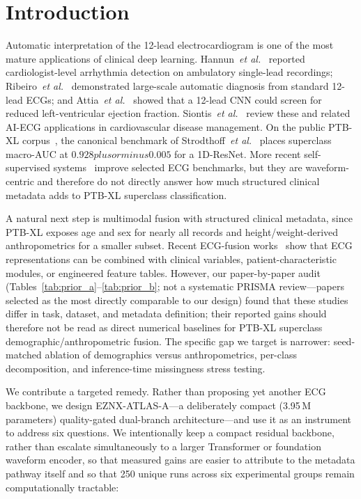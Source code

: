 \documentclass[mathematics,article,submit,pdftex]{Definitions/mdpi}
\def\textbf#1{#1}%
\def\emph#1{#1}%
\def\pm{plus or minus }%
\begin{document}
\section{Introduction}\label{sec:intro}

Automatic interpretation of the 12-lead electrocardiogram is one of the most mature applications of clinical deep learning. Hannun~\textit{et al.}~\cite{Hannun2019} reported cardiologist-level arrhythmia detection on ambulatory single-lead recordings; Ribeiro~\textit{et al.}~\cite{Ribeiro2020} demonstrated large-scale automatic diagnosis from standard 12-lead ECGs; and Attia~\textit{et al.}~\cite{Attia2019LV} showed that a 12-lead CNN could screen for reduced left-ventricular ejection fraction. Siontis~\textit{et al.}~\cite{Siontis2021} review these and related AI-ECG applications in cardiovascular disease management. On the public PTB-XL corpus~\cite{Wagner2020}, the canonical benchmark of Strodthoff~\textit{et al.}~\cite{Strodthoff2021} places superclass macro-AUC at $0.928 \pm 0.005$ for a 1D-ResNet. More recent self-supervised systems~\cite{Mehari2022, Weimann2025, Coppola2024, Nguyen2025} improve selected ECG benchmarks, but they are waveform-centric and therefore do not directly answer how much structured clinical metadata adds to PTB-XL superclass classification.

A natural next step is \emph{multimodal fusion} with structured clinical metadata, since PTB-XL exposes age and sex for nearly all records and height/weight-derived anthropometrics for a smaller subset. Recent ECG-fusion works~\cite{Qiu2024, Srivastava2025, Atwa2025, Holloway2026} show that ECG representations can be combined with clinical variables, patient-characteristic modules, or engineered feature tables. However, our paper-by-paper audit (Tables~\ref{tab:prior_a}--\ref{tab:prior_b}; not a systematic PRISMA review---papers selected as the most directly comparable to our design) found that these studies differ in task, dataset, and metadata definition; their reported gains should therefore not be read as direct numerical baselines for PTB-XL superclass demographic/anthropometric fusion. The specific gap we target is narrower: seed-matched ablation of demographics versus anthropometrics, per-class decomposition, and inference-time missingness stress testing.

We contribute a targeted remedy. Rather than proposing yet another ECG backbone, we design \textbf{EZNX-ATLAS-A}---a deliberately compact (3.95\,M parameters) quality-gated dual-branch architecture---and use it as an \emph{instrument} to address six questions. We intentionally keep a compact residual backbone, rather than escalate simultaneously to a larger Transformer or foundation waveform encoder, so that measured gains are easier to attribute to the metadata pathway itself and so that 250 unique runs across six experimental groups remain computationally tractable:
\end{document}

